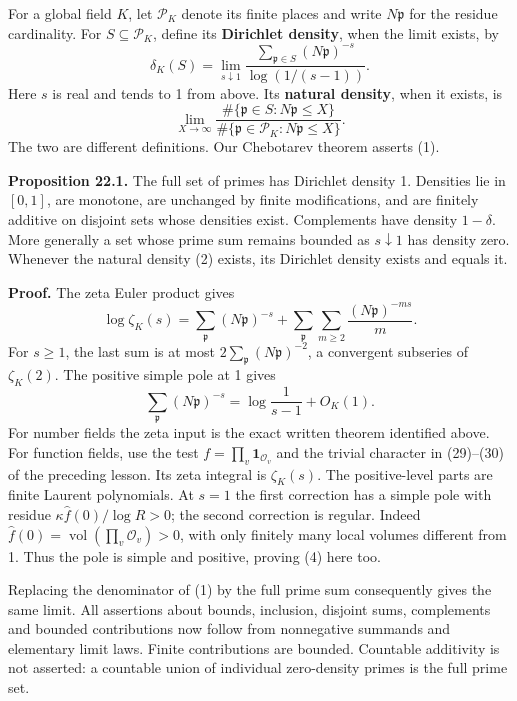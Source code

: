\documentclass[11pt,a4paper]{article}
\begin{document}
For a global field \(K\), let \(\mathcal P_K\) denote its finite places
and write \(N\mathfrak p\) for the residue cardinality. For
\(S\subseteq\mathcal P_K\), define its \textbf{Dirichlet density}, when
the limit exists, by \[
\delta_K(S)=\lim_{s\downarrow1}
\frac{\sum_{\mathfrak p\in S}(N\mathfrak p)^{-s}}
     {\log(1/(s-1))}.
\tag{1}
\] Here \(s\) is real and tends to 1 from above. Its \textbf{natural
density}, when it exists, is \[
\lim_{X\to\infty}
\frac{\#\{\mathfrak p\in S:N\mathfrak p\leq X\}}
     {\#\{\mathfrak p\in\mathcal P_K:N\mathfrak p\leq X\}}.
\tag{2}
\] The two are different definitions. Our Chebotarev theorem asserts
(1).

\textbf{Proposition 22.1.} The full set of primes has Dirichlet density
1. Densities lie in \([0,1]\), are monotone, are unchanged by finite
modifications, and are finitely additive on disjoint sets whose
densities exist. Complements have density \(1-\delta\). More generally a
set whose prime sum remains bounded as \(s\downarrow1\) has density
zero. Whenever the natural density (2) exists, its Dirichlet density
exists and equals it.

\textbf{Proof.} The zeta Euler product gives \[
\log\zeta_K(s)=\sum_{\mathfrak p}(N\mathfrak p)^{-s}
 +\sum_{\mathfrak p}\sum_{m\geq2}\frac{(N\mathfrak p)^{-ms}}m.
\tag{3}
\] For \(s\geq1\), the last sum is at most
\(2\sum_{\mathfrak p}(N\mathfrak p)^{-2}\), a convergent subseries of
\(\zeta_K(2)\). The positive simple pole at 1 gives \[
\sum_{\mathfrak p}(N\mathfrak p)^{-s}
=\log\frac1{s-1}+O_K(1).
\tag{4}
\] For number fields the zeta input is the exact written theorem
identified above. For function fields, use the test
\(f=\prod_v\mathbf1_{\mathcal O_v}\) and the trivial character in
(29)--(30) of the preceding lesson. Its zeta integral is \(\zeta_K(s)\).
The positive-level parts are finite Laurent polynomials. At \(s=1\) the
first correction has a simple pole with residue
\(\kappa\widehat f(0)/\log R>0\); the second correction is regular.
Indeed \(\widehat f(0)=\operatorname{vol}(\prod_v\mathcal O_v)>0\), with
only finitely many local volumes different from 1. Thus the pole is
simple and positive, proving (4) here too.

Replacing the denominator of (1) by the full prime sum consequently
gives the same limit. All assertions about bounds, inclusion, disjoint
sums, complements and bounded contributions now follow from nonnegative
summands and elementary limit laws. Finite contributions are bounded.
Countable additivity is not asserted: a countable union of individual
zero-density primes is the full prime set.
\end{document}
